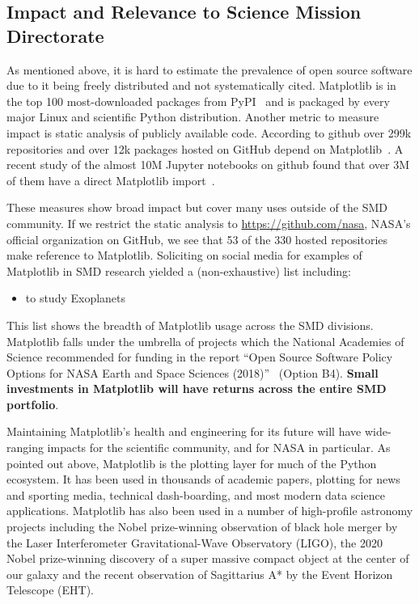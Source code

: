 \documentclass[12pt]{article}
\numberwithin{page}{section}
\begin{document}
\subsection{Impact and Relevance to Science Mission Directorate}



As mentioned above, it is hard to estimate the prevalence of open
source software due to it being freely distributed and not
systematically cited.  Matplotlib is in the top 100 most-downloaded
packages from PyPI~\cite{pypi_stats} and is packaged by every major
Linux and scientific Python distribution.  Another metric to measure
impact is static analysis of publicly available code.  According to
github over 299k repositories and over 12k packages hosted on GitHub
depend on Matplotlib~\cite{gh_deps:2021}. A recent study of the
almost 10M Jupyter notebooks on github found that over 3M of them have
a direct Matplotlib import~\cite{datalore:2020}.




These measures show broad impact but cover many uses outside of the
SMD community.  If we restrict the static analysis to
\url{https://github.com/nasa}, NASA's official organization on GitHub,
we see that 53 of the 330 hosted repositories make reference to
Matplotlib.  Soliciting on social media for examples of Matplotlib in SMD research
yielded a (non-exhaustive) list including:
\begin{itemize}[noitemsep]
\item  to study Exoplanets \cite{2020AJ....160..116G}
\end{itemize}
This list shows the breadth of Matplotlib usage across the SMD
divisions.  Matplotlib falls under the umbrella of projects which the
National Academies of Science recommended for funding in the report
``Open Source Software Policy Options for NASA Earth and Space
Sciences (2018)''~\cite{NAP25217} (Option B4).
\textbf{Small investments in Matplotlib will have returns across the
  entire SMD portfolio}.

Maintaining Matplotlib's health and engineering for its future will
have wide-ranging impacts for the scientific community, and for NASA in
particular.  As pointed out above, Matplotlib is the plotting layer
for much of the Python ecosystem.  It has been used in thousands of
academic papers, plotting for news and sporting media, technical
dash-boarding, and most modern data science applications.
Matplotlib has also been used in a number
of high-profile astronomy projects including the Nobel prize-winning
observation of black hole merger by the Laser Interferometer
Gravitational-Wave Observatory (LIGO), the 2020 Nobel prize-winning
discovery of a super massive compact object at the center of our
galaxy and the recent observation of Sagittarius A* by the Event
Horizon Telescope (EHT).
\end{document}
